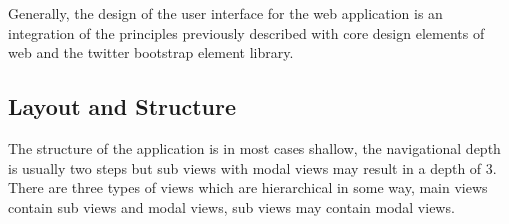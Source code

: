 
Generally, the design of the user interface for the web application is an integration of the principles previously described with core design elements of web and the twitter bootstrap element library. 

\subsection{Layout and Structure}
The structure of the application is in most cases shallow, the navigational depth is usually two steps but sub views with modal views may result in a depth of 3. There are three types of views which are hierarchical in some way, main views contain sub views and modal views, sub views may contain modal views.

